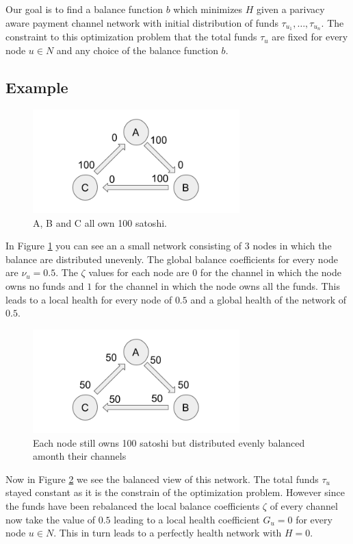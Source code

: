 \documentclass[a4paper]{paper}
\begin{document}
Our goal is to find a balance function $b$ which minimizes $H$ given a parivacy aware payment channel network with initial distribution of funds $\tau_{u_1},\dots,\tau_{u_n}$.
The constraint to this optimization problem that the total funds $\tau_u$ are fixed for every node $u \in N$ and any choice of the balance function $b$.

\subsection{Example}
\begin{figure}
 \centering
 \includegraphics[width=8cm]{img/evenUnbalanced.png}
 \caption{A, B and C all own 100 satoshi.}
 \label{fig:evenUnbalanced}
\end{figure}
In Figure \ref{fig:evenUnbalanced} you can see an a small network consisting of $3$ nodes in which the balance are distributed unevenly.
The global balance coefficients for every node are $\nu_u=0.5$.
The $\zeta$ values for each node are $0$ for the channel in which the node owns no funds and $1$ for the channel in which the node owns all the funds.
This leads to a local health for every node of $0.5$ and a global health of the network of $0.5$.
\begin{figure}
 \centering
 \includegraphics[width=8cm]{img/evenBalanced.png}
 \caption{Each node still owns 100 satoshi but distributed evenly balanced amonth their channels}
 \label{fig:evenBalanced}
\end{figure}
Now in Figure \ref{fig:evenBalanced} we see the balanced view of this network.
The total funds $\tau_u$ stayed constant as it is the constrain of the optimization problem.
However since the funds have been rebalanced the local balance coefficients $\zeta$ of every channel now take the value of $0.5$ leading to a local health coefficient $G_u=0$ for every node $u\in N$.
This in turn leads to a perfectly health network with $H=0$.
\end{document}
